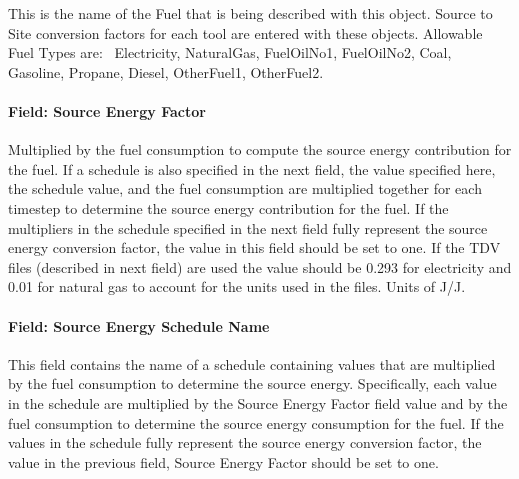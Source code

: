 This is the name of the Fuel that is being described with this object. Source to Site conversion factors for each tool are entered with these objects. Allowable Fuel Types are:~ Electricity, NaturalGas, FuelOilNo1, FuelOilNo2, Coal, Gasoline, Propane, Diesel, OtherFuel1, OtherFuel2.

\paragraph{Field: Source Energy Factor}\label{field-source-energy-factor}

Multiplied by the fuel consumption to compute the source energy contribution for the fuel. If a schedule is also specified in the next field, the value specified here, the schedule value, and the fuel consumption are multiplied together for each timestep to determine the source energy contribution for the fuel. If the multipliers in the schedule specified in the next field fully represent the source energy conversion factor, the value in this field should be set to one. If the TDV files (described in next field) are used the value should be 0.293 for electricity and 0.01 for natural gas to account for the units used in the files. Units of J/J.

\paragraph{Field: Source Energy Schedule Name}\label{field-source-energy-schedule-name}

This field contains the name of a schedule containing values that are multiplied by the fuel consumption to determine the source energy. Specifically, each value in the schedule are multiplied by the Source Energy Factor field value and by the fuel consumption to determine the source energy consumption for the fuel. If the values in the schedule fully represent the source energy conversion factor, the value in the previous field, Source Energy Factor should be set to one.

